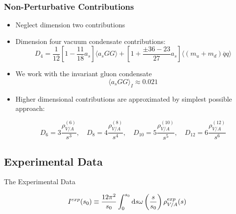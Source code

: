 \documentclass{beamer}
\begin{document}
\begin{frame}
  \frametitle{Non-Perturbative Contributions}
  \begin{itemize}
  \item Neglect dimension two contributions
  \item Dimension four vacuum condensate contributions:
    \begin{equation}
      D_{4} = \frac{1}{12}\left[ 1 - \frac{11}{18}a_s \right] \langle  a_s GG \rangle
      + \left[ 1 + \frac{\pm 36 - 23}{27} a_s \right] \langle (m_u + m_d) \overline{q}q \rangle
    \end{equation}
  \item We work with the invariant gluon condensate
    \begin{equation}
      \langle a_s GG \rangle_I \approx 0.021
    \end{equation}
  \item Higher dimensional contributions are approximated by simplest possible
    approach:
    \begin{small}
      \begin{equation}
        D_{6} = 3 \frac{\rho_{V/A}^{(6)}}{s^3}, \quad
        D_{8} = 4 \frac{\rho_{V/A}^{(8)}}{s^4}, \quad
        D_{10} = 5 \frac{\rho_{V/A}^{(10)}}{s^5}, \quad
        D_{12} = 6 \frac{\rho_{V/A}^{(12)}}{s^6}
      \end{equation}
    \end{small}
  \end{itemize}
\end{frame}

\subsection{Experimental Data}
\begin{frame}
  \centering \vspace{0.5cm}
  \begin{LARGE}
    The Experimental Data
  \end{LARGE}
  \begin{equation}
    I^{exp}(s_0) \equiv \frac{12 \pi^2}{s_0} \int_0^{s_0} \dif s \omega\left(\frac{s}{s_0}\right) \rho^{exp}_{V/A}(s)
  \end{equation}
\end{frame}
\end{document}
